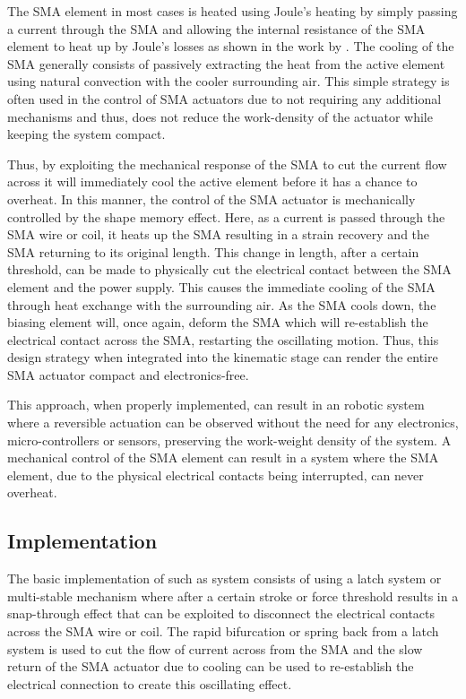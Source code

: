The SMA element in most cases is heated using Joule's heating by simply passing a current through the SMA and allowing the internal resistance of the SMA element to heat up by Joule's losses as shown in the work by \cite{huangSelectionShapeMemory2002}. The cooling of the SMA generally consists of passively extracting the heat from the active element using natural convection with the cooler surrounding air. This simple strategy is often used in the control of SMA actuators due to not requiring any additional mechanisms and thus, does not reduce the work-density of the actuator while keeping the system compact.

Thus, by exploiting the mechanical response of the SMA to cut the current flow across it will immediately cool the active element before it has a chance to overheat. In this manner, the control of the SMA actuator is mechanically controlled by the shape memory effect. Here, as a current is passed through the SMA wire or coil, it heats up the SMA resulting in a strain recovery and the SMA returning to its original length. This change in length, after a certain threshold, can be made to physically cut the electrical contact between the SMA element and the power supply. This causes the immediate cooling of the SMA through heat exchange with the surrounding air. As the SMA cools down, the biasing element will, once again, deform the SMA which will re-establish the electrical contact across the SMA, restarting the oscillating motion. Thus, this design strategy when integrated into the kinematic stage can render the entire SMA actuator compact and electronics-free.

This approach, when properly implemented, can result in an robotic system where a reversible actuation can be observed without the need for any electronics, micro-controllers or sensors, preserving the work-weight density of the system. A mechanical control of the SMA element can result in a system where the SMA element, due to the physical electrical contacts being interrupted, can never overheat.

\subsection{Implementation}\label{sec:magnetic-latch}
The basic implementation of such as system consists of using a latch system or multi-stable mechanism where after a certain stroke or force threshold results in a snap-through effect that can be exploited to disconnect the electrical contacts across the SMA wire or coil. The rapid bifurcation or spring back from a latch system is used to cut the flow of current across from the SMA and the slow return of the SMA actuator due to cooling can be used to re-establish the electrical connection to create this oscillating effect.

